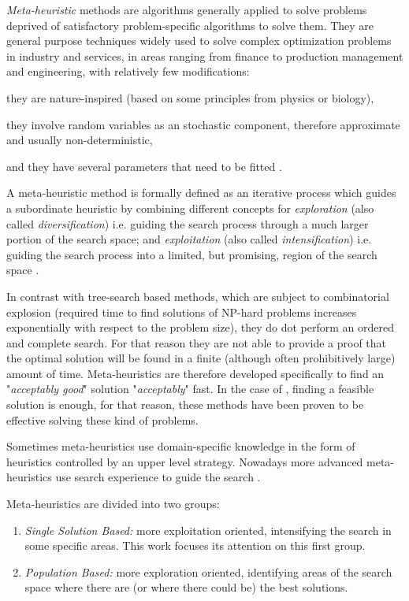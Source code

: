 {\it Meta-heuristic} methods are algorithms generally applied to solve problems deprived of satisfactory problem-specific algorithms to solve them. They are general purpose techniques widely used to solve complex optimization problems in industry and services, in areas ranging from finance to production management and engineering, with relatively few modifications: \begin{inparaenum}[i)] \item they are nature-inspired (based on some principles from physics or biology), \item they involve random variables as an stochastic component, therefore approximate and usually non-deterministic, \item and they have several parameters that need to be fitted \cite{Dreo2006}.\end{inparaenum} 

A meta-heuristic method is formally defined as an iterative process which guides a subordinate heuristic by combining different concepts for \textit{exploration} (also called \textit{diversification}) i.e. guiding the search process through a much larger portion of the search space; and \textit{exploitation} (also called \textit{intensification}) i.e. guiding the search process into a limited, but promising, region of the search space \cite{Osman1996}.

In contrast with tree-search based methods, which are subject to combinatorial explosion (required time to find solutions of NP-hard problems increases exponentially with respect to the problem size), they do dot perform an ordered and complete search. For that reason they are not able to provide a proof that the optimal solution will be found in a finite (although often prohibitively large) amount of time. Meta-heuristics are therefore developed specifically to find an "\textit{acceptably good}" solution "\textit{acceptably}" fast. In the case of \csps, finding a feasible solution is enough, for that reason, these methods have been proven to be effective solving these kind of problems.

Sometimes meta-heuristics use domain-specific knowledge in the form of heuristics controlled by an upper level strategy. Nowadays more advanced meta-heuristics use search experience to guide the search \cite{Blum2003}.

Meta-heuristics are divided into two groups: %
\begin{enumerate}%
    \item {\it Single Solution Based:} more exploitation oriented, intensifying the search in some specific areas. This work focuses its attention on this first group.
    \item {\it Population Based:} more exploration oriented, identifying areas of the search space where there are (or where there could be) the best solutions. %
\end{enumerate} %


